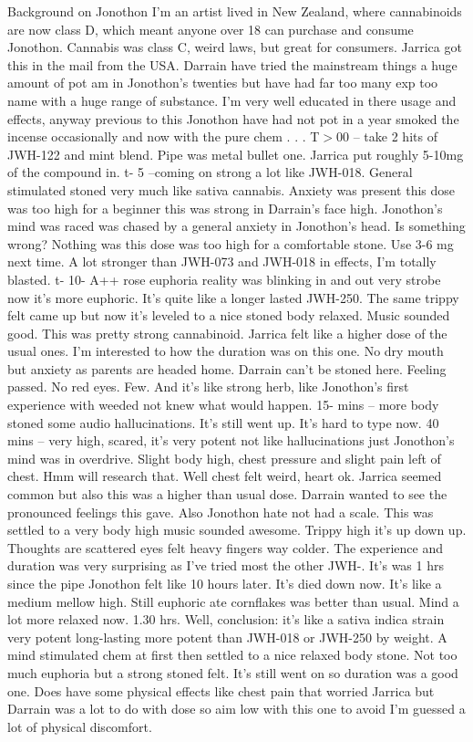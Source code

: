 \documentclass[12pt]{book}
\begin{document}
Background on Jonothon I'm an artist lived in New Zealand, where cannabinoids are now class D, which meant anyone over 18 can purchase and consume Jonothon. Cannabis was class C, weird laws, but great for consumers. Jarrica got this in the mail from the USA. Darrain have tried the mainstream things a huge amount of pot am in Jonothon's twenties but have had far too many exp too name with a huge range of substance. I'm very well educated in there usage and effects, anyway previous to this Jonothon have had not pot in a year smoked the incense occasionally and now with the pure chem . . .  T$>$00 -- take 2 hits of JWH-122 and mint blend. Pipe was metal bullet one. Jarrica put roughly 5-10mg of the compound in. t- 5 --coming on strong a lot like JWH-018. General stimulated stoned very much like sativa cannabis. Anxiety was present this dose was too high for a beginner this was strong in Darrain's face high. Jonothon's mind was raced was chased by a general anxiety in Jonothon's head. Is something wrong? Nothing was this dose was too high for a comfortable stone. Use 3-6 mg next time. A lot stronger than JWH-073 and JWH-018 in effects, I'm totally blasted. t- 10- A++ rose euphoria reality was blinking in and out very strobe now it's more euphoric. It's quite like a longer lasted JWH-250. The same trippy felt came up but now it's leveled to a nice stoned body relaxed. Music sounded good. This was pretty strong cannabinoid. Jarrica felt like a higher dose of the usual ones. I'm interested to how the duration was on this one. No dry mouth but anxiety as parents are headed home. Darrain can't be stoned here. Feeling passed. No red eyes. Few. And it's like strong herb, like Jonothon's first experience with weeded not knew what would happen. 15- mins -- more body stoned some audio hallucinations. It's still went up. It's hard to type now. 40 mins -- very high, scared, it's very potent not like hallucinations just Jonothon's mind was in overdrive. Slight body high, chest pressure and slight pain left of chest. Hmm will research that. Well chest felt weird, heart ok. Jarrica seemed common but also this was a higher than usual dose. Darrain wanted to see the pronounced feelings this gave. Also Jonothon hate not had a scale. This was settled to a very body high music sounded awesome. Trippy high it's up down up. Thoughts are scattered eyes felt heavy fingers way colder. The experience and duration was very surprising as I've tried most the other JWH-. It's was 1 hrs since the pipe Jonothon felt like 10 hours later. It's died down now. It's like a medium mellow high. Still euphoric ate cornflakes was better than usual. Mind a lot more relaxed now. 1.30 hrs. Well, conclusion: it's like a sativa indica strain very potent long-lasting more potent than JWH-018 or JWH-250 by weight. A mind stimulated chem at first then settled to a nice relaxed body stone. Not too much euphoria but a strong stoned felt. It's still went on so duration was a good one. Does have some physical effects like chest pain that worried Jarrica but Darrain was a lot to do with dose so aim low with this one to avoid I'm guessed a lot of physical discomfort.
\end{document}
